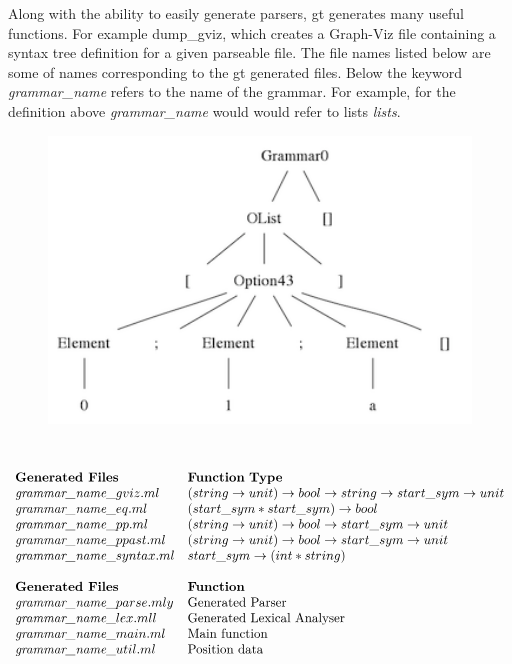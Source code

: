 Along with the ability to easily generate parsers, gt generates many useful functions. For example dump\_gviz,
which creates a Graph-Viz file containing a syntax tree definition for a given parseable file. The file names listed below are 
some of names corresponding to the gt generated files. Below the keyword \textit{grammar\_name} refers to the name of the 
grammar. For example, for the definition above \textit{grammar\_name} would would refer to lists \textit{lists}. 

\begin{figure}[h!]
  \centering
  \includegraphics[width=4.5in]{./intro/lists.png}
  \caption{}
\end{figure}\ \\
\[
\begin{array}{ll}
\textnormal{\bf{Generated Files}} & \bf{Function\ Type} \\
\textit{grammar\_name}\_gviz.ml  & (string \to unit) \to bool \to string \to start\_sym \to unit \\
\textit{grammar\_name}\_eq.ml  & (start\_sym * start\_sym) \to bool \\
\textit{grammar\_name}\_pp.ml & (string \to unit) \to bool \to start\_sym \to unit \\
\textit{grammar\_name}\_ppast.ml & (string \to unit) \to bool \to start\_sym \to unit \\
\textit{grammar\_name}\_syntax.ml & start\_sym \to (int * string) \\
\ & \ \\
\textnormal{\bf{Generated Files}} & \bf{Function} \\
\textit{grammar\_name}\_parse.mly & \textnormal{Generated Parser} \\
\textit{grammar\_name}\_lex.mll & \textnormal{Generated Lexical Analyser} \\
\textit{grammar\_name}\_main.ml & \textnormal{Main function} \\
\textit{grammar\_name}\_util.ml & \textnormal{Position data} 
\end{array}
\]



